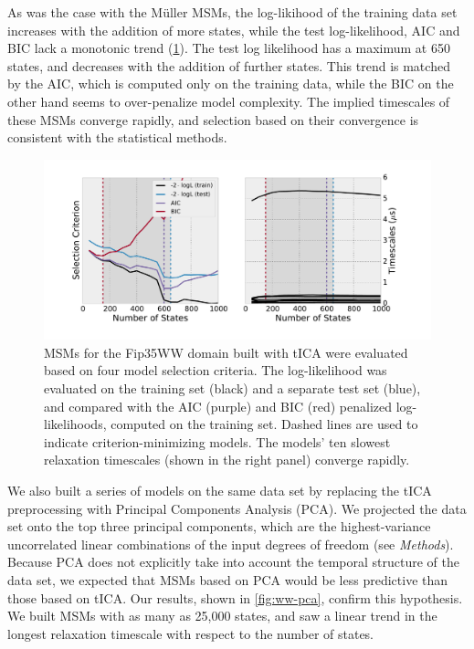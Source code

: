 \documentclass[journal=jpcbfk, layout=traditional, manuscript=article]{achemso}
\begin{document}
As was the case with the M\"{u}ller MSMs, the log-likihood of the training data set increases with the addition of more states, while the test log-likelihood, AIC and BIC lack a monotonic trend (\cref{fig:ww-tica}). The test log likelihood has a maximum at 650 states, and decreases with the addition of further states. This trend is matched by the AIC, which is computed only on the training data, while the BIC on the other hand seems to over-penalize model complexity. The implied timescales of these MSMs converge rapidly, and selection based on their convergence is consistent with the statistical methods.

\begin{figure}
\centering
\label{fig:ww-tica}
\includegraphics[width=6in]{figs/ww_tica/ww_tica.pdf}

\caption{MSMs for the Fip35WW domain built with tICA were evaluated based on four model selection criteria. The log-likelihood was evaluated on the training set (black) and a separate test set (blue), and compared with the AIC (purple) and BIC (red) penalized log-likelihoods, computed on the training set. Dashed lines are used to indicate criterion-minimizing models. The models' ten slowest relaxation timescales (shown in the right panel) converge rapidly. }
\end{figure}

We also built a series of models on the same data set by replacing the tICA preprocessing with Principal Components Analysis (PCA). We projected the data set onto the top three principal components, which are the highest-variance uncorrelated linear combinations of the input degrees of freedom (see \emph{Methods}). Because PCA does not explicitly take into account the temporal structure of the data set, we expected that MSMs based on PCA would be less predictive than those based on tICA. Our results, shown in \cref{fig:ww-pca}, confirm this hypothesis. We built MSMs with as many as 25,000 states, and saw a linear trend in the longest relaxation timescale with respect to the number of states.
\end{document}
